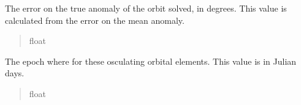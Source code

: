 \documentclass[letterpaper,11pt,english]{sphinxmanual}
\begin{document}
\begin{savenotes}
\begin{fulllineitems}

\begin{savenotes}\begin{fulllineitems}
\label{\detokenize{code/opihiexarata.orbit.solution:opihiexarata.orbit.solution.OrbitalSolution.true_anomaly_error}}
\pysigstartsignatures
{}
\pysigstopsignatures
\sphinxAtStartPar
The error on the true anomaly of the orbit solved, in degrees. This
value is calculated from the error on the mean anomaly.
\begin{quote}\begin{description}
\sphinxAtStartPar
float

\end{description}\end{quote}

\end{fulllineitems}\end{savenotes}


\begin{savenotes}\begin{fulllineitems}
\label{\detokenize{code/opihiexarata.orbit.solution:opihiexarata.orbit.solution.OrbitalSolution.epoch_julian_day}}
\pysigstartsignatures
{}
\pysigstopsignatures
\sphinxAtStartPar
The epoch where for these osculating orbital elements. This value is
in Julian days.
\begin{quote}\begin{description}
\sphinxAtStartPar
float

\end{description}\end{quote}

\end{fulllineitems}\end{savenotes}



\end{fulllineitems}
\end{savenotes}
\end{document}
